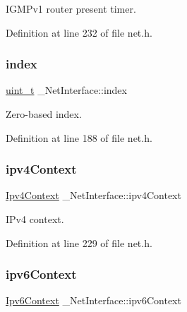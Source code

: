 I\+G\+M\+Pv1 router present timer. 



Definition at line 232 of file net.\+h.

\mbox{\label{struct__NetInterface_a9eb2e832ba1078f3b5aff061d7e1404c}} 
\subsubsection{\texorpdfstring{index}{index}}
{\footnotesize\ttfamily \hyperlink{compiler__port_8h_a12a1e9b3ce141648783a82445d02b58d}{uint\+\_\+t} \+\_\+\+Net\+Interface\+::index}



Zero-\/based index. 



Definition at line 188 of file net.\+h.

\mbox{\label{struct__NetInterface_abfe564ed4bf1a18d852612ad67b94d57}} 
\subsubsection{\texorpdfstring{ipv4\+Context}{ipv4Context}}
{\footnotesize\ttfamily \hyperlink{structIpv4Context}{Ipv4\+Context} \+\_\+\+Net\+Interface\+::ipv4\+Context}



I\+Pv4 context. 



Definition at line 229 of file net.\+h.

\mbox{\label{struct__NetInterface_adec5cea8de75f6b862bf481ff162e566}} 
\subsubsection{\texorpdfstring{ipv6\+Context}{ipv6Context}}
{\footnotesize\ttfamily \hyperlink{structIpv6Context}{Ipv6\+Context} \+\_\+\+Net\+Interface\+::ipv6\+Context}



